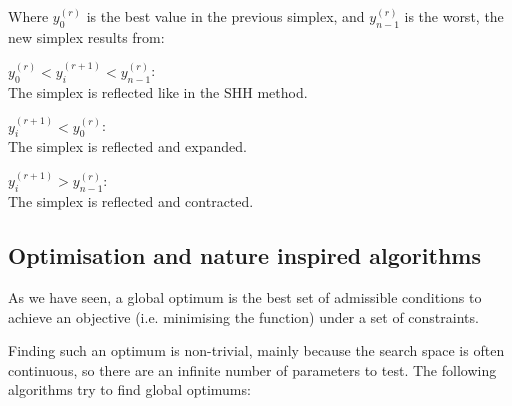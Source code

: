 \begin{description}
    Where $y^{(r)}_0$ is the best value in the previous simplex, and
    $y^{(r)}_{n-1}$ is the worst, the new simplex results from:

    \begin{description}
      \item $y^{(r)}_0 < y^{(r+1)}_{i} < y^{(r)}_{n-1}$:\\
        The simplex is reflected like in the SHH method.
      \item $y^{(r+1)}_{i} < y^{(r)}_{0}$:\\
        The simplex is reflected and expanded.
      \item $y^{(r+1)}_{i} > y^{(r)}_{n-1}$:\\
        The simplex is reflected and contracted.
    \end{description}
\end{description}


\subsection{Optimisation and nature inspired algorithms}

As we have seen, a global optimum is the best set of admissible conditions to
achieve an objective (i.e. minimising the function) under a set of constraints.

Finding such an optimum is non-trivial, mainly because the search space is often
continuous, so there are an infinite number of parameters to test. The following
algorithms try to find global optimums:

